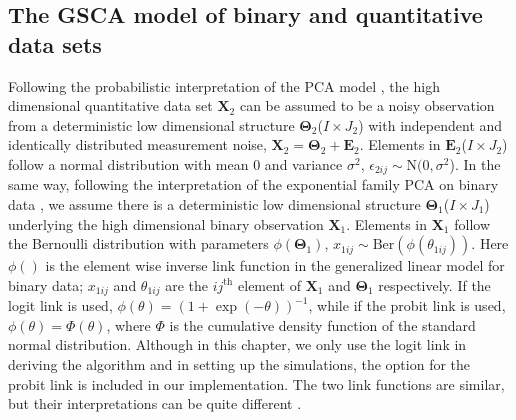 \subsection{The GSCA model of binary and quantitative data sets}
Following the probabilistic interpretation of the PCA model \cite{tipping1999probabilistic}, the high dimensional quantitative data set $\mathbf{X}_2$ can be assumed to be a noisy observation from a deterministic low dimensional structure $\mathbf{\Theta}_2$($I\times J_2$) with independent and identically distributed measurement noise, $\mathbf{X}_2 = \mathbf{\Theta}_2 + \mathbf{E}_2$. Elements in $\mathbf{E}_2$($I\times J_2$) follow a normal distribution with mean 0 and variance $\sigma^2$, $\epsilon_{2ij} \sim \text{N}(0,\sigma^2$). In the same way, following the interpretation of the exponential family PCA on binary data \cite{collins2002generalization}, we assume there is a deterministic low dimensional structure $\mathbf{\Theta}_1$($I\times J_1$) underlying the high dimensional binary observation $\mathbf{X}_1$. Elements in $\mathbf{X}_1$ follow the Bernoulli distribution with parameters $\phi(\mathbf{\Theta}_1)$, $x_{1ij} \sim \text{Ber}(\phi(\theta_{1ij}))$. Here $\phi()$ is the element wise inverse link function in the generalized linear model for binary data; $x_{1ij}$ and $\theta_{1ij}$ are the $ij^{\text{th}}$ element of $\mathbf{X}_1$ and $\mathbf{\Theta}_1$ respectively. If the logit link is used, $\phi(\theta) = (1+\exp(-\theta))^{-1}$, while if the probit link is used, $\phi(\theta) = \Phi(\theta)$, where $\Phi$ is the cumulative density function of the standard normal distribution. Although in this chapter, we only use the logit link in deriving the algorithm and in setting up the simulations, the option for the probit link is included in our implementation. The two link functions are similar, but their interpretations can be quite different \cite{agresti2013categorical}.

